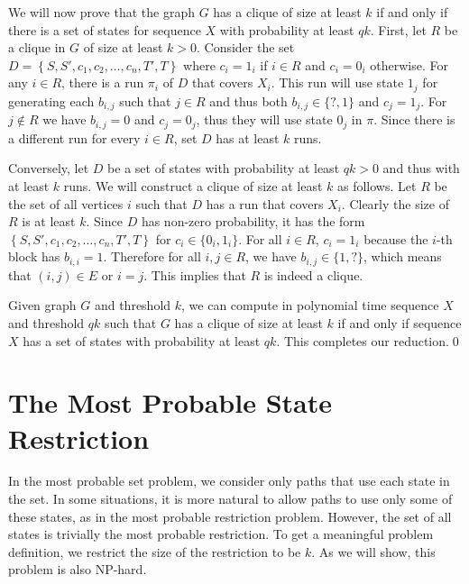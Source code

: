 We will now prove that the graph $G$ has a clique of size at least $k$ if and
only if there is a set of states for sequence $X$ with probability at least
$qk$.  First, let $R$ be a clique in $G$ of size at least $k>0$.  Consider the
set $D=\left\{S,S',{c_1},{c_2},\dots,{c_n},T',T\right\}$ where $c_i=1_i$ if
$i\in R$ and $c_i=0_i$ otherwise. For any $i\in R$, there is a run $\pi_i$ of
$D$ that covers $X_i$. This run will use state $1_j$ for generating each
$b_{i,j}$ such that $j\in R$ and thus both $b_{i,j}\in \{?,1\}$ and $c_j=1_j$.
For $j\notin R$ we have $b_{i,j}=0$ and $c_j=0_j$, thus they will use state
$0_j$ in $\pi$. Since there is a different run for every $i\in R$, set $D$ has
at least $k$ runs.

Conversely, let $D$ be a set of states with probability at least $qk>0$
and thus with at least $k$ runs. We will construct a clique of size at least $k$
as follows. Let $R$ be the set of all vertices $i$ such that $D$ has a run that
covers $X_i$. Clearly the size of $R$ is at least $k$.  Since $D$ has non-zero
probability, it has the form $\left\{S,S',c_1,c_2,\dots,c_n,T',T\right\}$ for
$c_i\in \{0_i,1_i\}$. For all $i\in R$, $c_i=1_i$ because the $i$-th block has
$b_{i,i}=1$. Therefore for all $i,j\in R$, we have $b_{i,j}\in \{1,?\}$, which
means that $(i,j)\in E$ or $i=j$. This implies that $R$ is indeed a clique.

Given graph $G$ and threshold $k$, we can compute in
polynomial time sequence $X$ and threshold $qk$ such that $G$ has a
clique of size at least $k$ if and only if sequence $X$ has a
set of states with probability at least $qk$. This completes our reduction.\qed

\section{The Most Probable State Restriction}

\label{sec:restriction}

\begin{reformulate*}
In the most probable set problem, we consider only paths that use each
state in the set. In some situations, it is more natural to allow
paths to use only some of these states, as in the most probable
restriction problem. However, the set of all states is
trivially the most probable restriction. To get a meaningful problem
definition, we restrict the size of the restriction to be $k$. As we
will show, this problem is also NP-hard.
\end{reformulate*}

